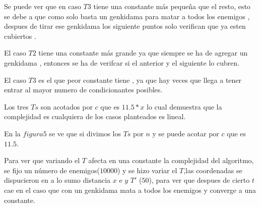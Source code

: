 	Se puede ver que en caso $T3$ tiene una constante más pequeña que el resto, esto se debe a que como solo basta un genkidama para matar a todos los enemigos , despues de tirar ese genkidama los siguiente puntos solo verifican que ya esten cubiertos .

	El caso $T2$ tiene una constante más grande ya que siempre se ha de agregar un genkidama , entonces se ha de verifcar si el anterior y el siguiente lo cubren. 

	El caso $T3$ es el que peor constante tiene , ya que hay veces que llega a tener entrar al mayor numero de condicionantes posibles.

	Los tres $Ts$ son acotados por $c$ que es $11.5 * x$ lo cual demuestra que la complejidad es cualquiera de los casos planteados es lineal. 

	
	\begin{figure}[H]
		\centering
		\caption{}
		\label{fig:tiempo_sobre_n}
	\end{figure}

	En la $figura 5$ se ve que si divimos los $Ts$ por $n$ y se puede acotar por $c$ que es $11.5$.

	

	Para ver que variando el $T$ afecta en una constante la complejidad del algoritmo, se fijo un número de enemigos($10000$) y se hizo variar el $T$,las coordenadas se dispucieron en a lo sumo distancia $x$ e $y$ $T'$ ($50$), para ver que despues de cierto $t$ cae en el caso que con un genkidama mata a todos los enemigos y converge a una constante.  

